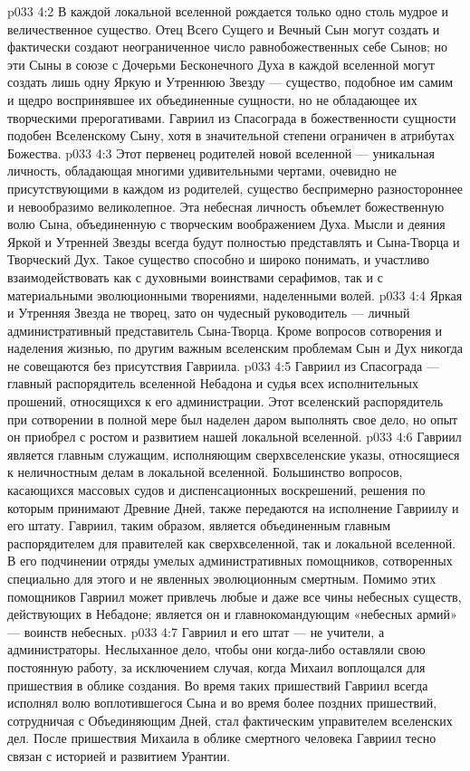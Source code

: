 \vs p033 4:2 В каждой локальной вселенной рождается только одно столь мудрое и величественное существо. Отец Всего Сущего и Вечный Сын могут создать и фактически создают неограниченное число равнобожественных себе Сынов; но эти Сыны в союзе с Дочерьми Бесконечного Духа в каждой вселенной могут создать лишь одну Яркую и Утреннюю Звезду --- существо, подобное им самим и щедро воспринявшее их объединенные сущности, но не обладающее их творческими прерогативами. Гавриил из Спасограда в божественности сущности подобен Вселенскому Сыну, хотя в значительной степени ограничен в атрибутах Божества.
\vs p033 4:3 Этот первенец родителей новой вселенной --- уникальная личность, обладающая многими удивительными чертами, очевидно не присутствующими в каждом из родителей, существо беспримерно разностороннее и невообразимо великолепное. Эта небесная личность объемлет божественную волю Сына, объединенную с творческим воображением Духа. Мысли и деяния Яркой и Утренней Звезды всегда будут полностью представлять и Сына\hyp{}Творца и Творческий Дух. Такое существо способно и широко понимать, и участливо взаимодействовать как с духовными воинствами серафимов, так и с материальными эволюционными творениями, наделенными волей.
\vs p033 4:4 \pc Яркая и Утренняя Звезда не творец, зато он чудесный руководитель --- личный административный представитель Сына\hyp{}Творца. Кроме вопросов сотворения и наделения жизнью, по другим важным вселенским проблемам Сын и Дух никогда не совещаются без присутствия Гавриила.
\vs p033 4:5 Гавриил из Спасограда --- главный распорядитель вселенной Небадона и судья всех исполнительных прошений, относящихся к его администрации. Этот вселенский распорядитель при сотворении в полной мере был наделен даром выполнять свое дело, но опыт он приобрел с ростом и развитием нашей локальной вселенной.
\vs p033 4:6 Гавриил является главным служащим, исполняющим сверхвселенские указы, относящиеся к неличностным делам в локальной вселенной. Большинство вопросов, касающихся массовых судов и диспенсационных воскрешений, решения по которым принимают Древние Дней, также передаются на исполнение Гавриилу и его штату. Гавриил, таким образом, является объединенным главным распорядителем для правителей как сверхвселенной, так и локальной вселенной. В его подчинении отряды умелых административных помощников, сотворенных специально для этого и не явленных эволюционным смертным. Помимо этих помощников Гавриил может привлечь любые и даже все чины небесных существ, действующих в Небадоне; является он и главнокомандующим «небесных армий» --- воинств небесных.
\vs p033 4:7 \pc Гавриил и его штат --- не учители, а администраторы. Неслыханное дело, чтобы они когда\hyp{}либо оставляли свою постоянную работу, за исключением случая, когда Михаил воплощался для пришествия в облике создания. Во время таких пришествий Гавриил всегда исполнял волю воплотившегося Сына и во время более поздних пришествий, сотрудничая с Объединяющим Дней, стал фактическим управителем вселенских дел. После пришествия Михаила в облике смертного человека Гавриил тесно связан с историей и развитием Урантии.
